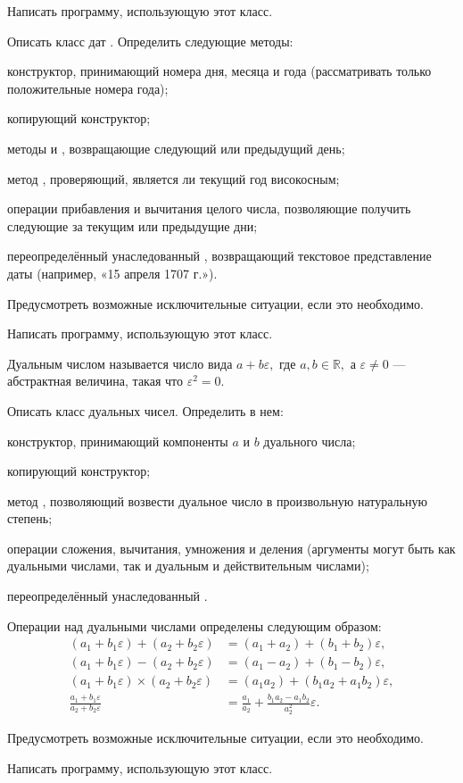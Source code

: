Написать программу, использующую этот класс.

\task Описать класс дат . Определить следующие методы:
\begin{itemize*}
\item конструктор, принимающий номера дня, месяца и года
  (рассматривать только положительные номера года);
\item копирующий конструктор;
\item методы  и , возвращающие следующий или
  предыдущий день;
\item метод , проверяющий, является ли текущий год
  високосным;
\item операции прибавления и вычитания целого числа, позволяющие
  получить следующие за текущим или предыдущие дни;
\item переопределённый унаследованный , возвращающий текстовое
  представление даты (например, «15 апреля 1707 г.»).
\end{itemize*}

Предусмотреть возможные исключительные ситуации, если это необходимо.

Написать программу, использующую этот класс.

\task Дуальным числом называется число вида $a+b\varepsilon,$ где $a,
b \in \mathbb{R},$ а $\varepsilon \neq 0$ — абстрактная величина,
такая что $\varepsilon^2 = 0$.

Описать класс  дуальных чисел. Определить в нем:
\begin{itemize*}
\item конструктор, принимающий компоненты $a$ и $b$ дуального числа;
\item копирующий конструктор;
\item метод , позволяющий возвести дуальное число в
  произвольную натуральную степень;
\item операции сложения, вычитания, умножения и деления (аргументы
  могут быть как дуальными числами, так и дуальным и действительным
  числами);
\item переопределённый унаследованный .
\end{itemize*}

Операции над дуальными числами определены
следующим образом:
\begin{align*}
  (a_1+b_1\varepsilon) + (a_2+b_2\varepsilon) &= (a_1+a_2) + (b_1+b_2)\varepsilon,\\
  (a_1+b_1\varepsilon) - (a_2+b_2\varepsilon) &= (a_1-a_2) + (b_1-b_2)\varepsilon,\\
  (a_1+b_1\varepsilon) \times (a_2+b_2\varepsilon) &= (a_1a_2) + (b_1a_2+a_1b_2)\varepsilon,\\
  \frac{a_1+b_1\varepsilon}{a_2+b_2\varepsilon} &=
  \frac{a_1}{a_2} + \frac{b_1a_2-a_1b_2}{a_2^2}\varepsilon.
\end{align*}

Предусмотреть возможные исключительные ситуации, если это необходимо.

Написать программу, использующую этот класс.

